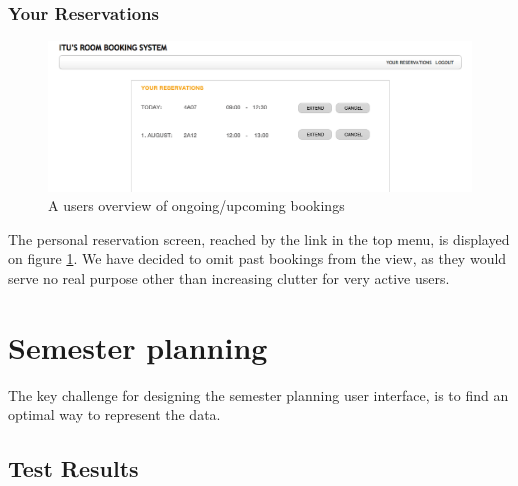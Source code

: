 \subsubsection*{Your Reservations}
\begin{figure}[htb]
\begin{center}
\leavevmode
\includegraphics[width=1\textwidth]{images/screens/reservations}
\end{center}
\caption{A users overview of ongoing/upcoming bookings}
\label{fig:reservations}
\end{figure}
The personal reservation screen, reached by the link in the top menu, is displayed on figure \ref{fig:reservations}. We have decided to omit past bookings from the view, as they would serve no real purpose other than increasing clutter for very active users.

\section{Semester planning}
\label{sec:semester_planning_ui}
The key challenge for designing the semester planning user interface, is to find an optimal way to represent the data.


\subsection{Test Results}
\label{subsec:test_results_sp}

